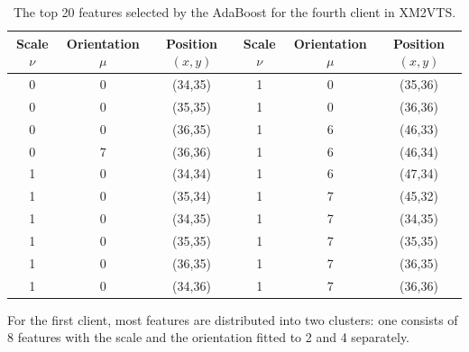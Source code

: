 \begin{table}[p]
 \caption{The top 20 features selected by the AdaBoost for the fourth client in XM2VTS.}
\begin{center}
  \begin{tabular}{|c|c|c||c|c|c|}\hline
   \small{Scale $\nu$} & \small{Orientation $\mu$} & \small{Position $(x,y)$} & \small{Scale $\nu$} & \small{Orientation $\mu$} & \small{Position $(x,y)$}\\\hline
   0&0&(34,35)&1&0&(35,36)\\\hline
   0&0&(35,35)&1&0&(36,36)\\\hline
   0&0&(36,35)&1&6&(46,33)\\\hline
   0&7&(36,36)&1&6&(46,34)\\\hline
   1&0&(34,34)&1&6&(47,34)\\\hline
   1&0&(35,34)&1&7&(45,32)\\\hline
   1&0&(34,35)&1&7&(34,35)\\\hline
   1&0&(35,35)&1&7&(35,35)\\\hline
   1&0&(36,35)&1&7&(36,35)\\\hline
   1&0&(34,36)&1&7&(36,36)\\\hline
  \end{tabular}
 \label{tab:4thclient}
\end{center}
\end{table}
For the first client, most features are distributed into two clusters: one consists of 8 features with the scale and the orientation fitted to 2 and 4 separately.

